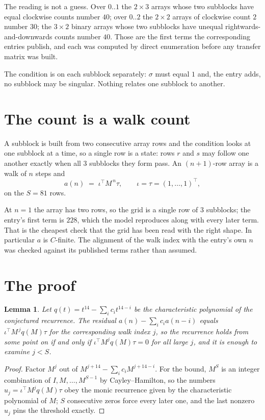 \documentclass[11pt,a4paper]{article}
\theoremstyle{plain}
\newtheorem{lemma}[theorem]{Lemma}
\theoremstyle{definition}
\begin{document}
The reading is not a guess. Over $0..1$ the $2\times3$ arrays whose two subblocks have equal
clockwise counts number $40$; over $0..2$ the $2\times2$ arrays of clockwise count $2$ number
$30$; the $3\times2$ binary arrays whose two subblocks have unequal rightwards-and-downwards
counts number $40$. Those are the first terms the corresponding entries publish, and each was
computed by direct enumeration before any transfer matrix was built.

The condition is on each subblock separately: $\sigma$ must equal $1$ and, the entry adds, no subblock may be singular. Nothing
relates one subblock to another.

\section{The count is a walk count}

A subblock is built from two consecutive array rows and the condition looks
at one subblock at a time, so a single row is a state: rows $r$ and $s$ may follow one another
exactly when all $3$ subblocks they form pass. An $(n+1)$-row array is a walk of $n$ steps and
\[
a(n)\;=\;\iota^{\!\top}M^{\,n}\tau,\qquad\iota=\tau=(1,\dots,1)^{\!\top},
\]
on the $S=81$ rows.

At $n=1$ the array has two rows, so the grid is a single row of $3$
subblocks; the entry's first term is $228$, which the model
reproduces along with every later term. That is the cheapest check that the grid has been read
with the right shape.
In particular $a$ is $C$-finite. The alignment of the walk index with the entry's own $n$ was
checked against its published terms rather than assumed.

\section{The proof}

\begin{lemma}\label{lem:crit}
Let $q(t)=t^{14}-\sum_i c_it^{14-i}$ be the characteristic polynomial of the
conjectured recurrence. The residual $a(n)-\sum_ic_ia(n-i)$ equals
$\iota^{\!\top}M^{\,j}q(M)\tau$ for the corresponding walk index $j$, so the recurrence
holds from some point on if and only if $\iota^{\!\top}M^{j}q(M)\tau=0$ for all large $j$,
and it is enough to examine $j<S$.
\end{lemma}

\begin{proof}
Factor $M^{j}$ out of $M^{j+14}-\sum_ic_iM^{j+14-i}$. For the bound, $M^{S}$
is an integer combination of $I,M,\dots,M^{S-1}$ by Cayley--Hamilton, so the numbers
$u_j=\iota^{\!\top}M^{j}q(M)\tau$ obey the monic recurrence given by the characteristic
polynomial of $M$; $S$ consecutive zeros force every later one, and the last nonzero $u_j$
pins the threshold exactly.
\end{proof}
\end{document}
